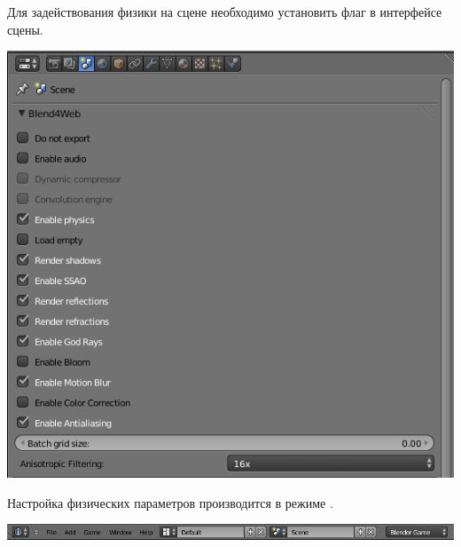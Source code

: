 \documentclass[a4paper,12pt,oneside]{sphinxmanual}
\begin{document}
Для задействования физики на сцене необходимо установить флаг  в интерфейсе сцены.

\includegraphics[width=1.000\linewidth]{scene.jpg}

\begin{DUlineblock}{0em}
\item[] 
\end{DUlineblock}

Настройка физических параметров производится в режиме .

\includegraphics[width=1.000\linewidth]{info_panel.jpg}

\begin{DUlineblock}{0em}
\item[] 
\end{DUlineblock}
\end{document}
